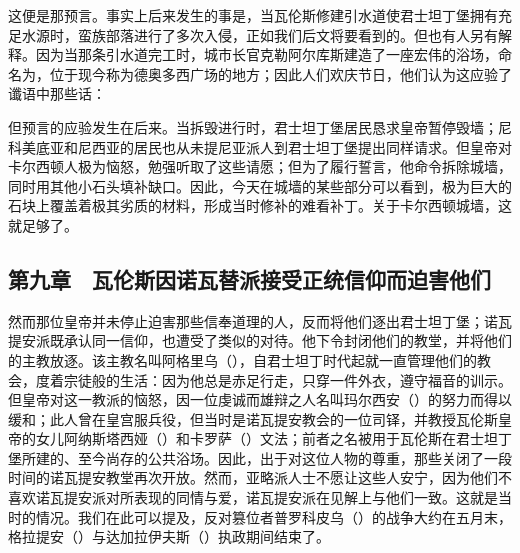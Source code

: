 \par

这便是那预言。事实上后来发生的事是，当瓦伦斯修建引水道使君士坦丁堡拥有充足水源时，蛮族部落进行了多次入侵，正如我们后文将要看到的。但也有人另有解释。因为当那条引水道完工时，城市长官克勒阿尔库斯建造了一座宏伟的浴场，命名为，位于现今称为德奥多西广场的地方；因此人们欢庆节日，他们认为这应验了谶语中那些话：\par

\par

但预言的应验发生在后来。当拆毁进行时，君士坦丁堡居民恳求皇帝暂停毁墙；尼科美底亚和尼西亚的居民也从未提尼亚派人到君士坦丁堡提出同样请求。但皇帝对卡尔西顿人极为恼怒，勉强听取了这些请愿；但为了履行誓言，他命令拆除城墙，同时用其他小石头填补缺口。因此，今天在城墙的某些部分可以看到，极为巨大的石块上覆盖着极其劣质的材料，形成当时修补的难看补丁。关于卡尔西顿城墙，这就足够了。\par


\subsection{第九章　瓦伦斯因诺瓦替派接受正统信仰而迫害他们}

然而那位皇帝并未停止迫害那些信奉道理的人，反而将他们逐出君士坦丁堡；诺瓦提安派既承认同一信仰，也遭受了类似的对待。他下令封闭他们的教堂，并将他们的主教放逐。该主教名叫阿格里乌（），自君士坦丁时代起就一直管理他们的教会，度着宗徒般的生活：因为他总是赤足行走，只穿一件外衣，遵守福音的训示。但皇帝对这一教派的恼怒，因一位虔诚而雄辩之人名叫玛尔西安（）的努力而得以缓和；此人曾在皇宫服兵役，但当时是诺瓦提安教会的一位司铎，并教授瓦伦斯皇帝的女儿阿纳斯塔西娅（）和卡罗萨（）文法；前者之名被用于瓦伦斯在君士坦丁堡所建的、至今尚存的公共浴场。因此，出于对这位人物的尊重，那些关闭了一段时间的诺瓦提安教堂再次开放。然而，亚略派人士不愿让这些人安宁，因为他们不喜欢诺瓦提安派对所表现的同情与爱，诺瓦提安派在见解上与他们一致。这就是当时的情况。我们在此可以提及，反对篡位者普罗科皮乌（）的战争大约在五月末，格拉提安（）与达加拉伊夫斯（）执政期间结束了。\par

